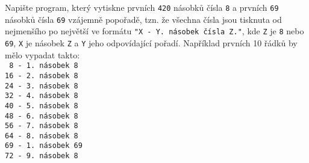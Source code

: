 \question[100]
Napište program, který vytiskne prvních \texttt{420} násobků čísla \texttt{8} a
prvních \texttt{69} násobků čísla \texttt{69} vzájemně popořadě, tzn. že
všechna
čísla jsou tisknuta od nejmenšího po největší ve formátu \texttt{"X -
	Y. násobek
	čísla Z."}, kde \texttt{Z} je \texttt{8} nebo \texttt{69},
\texttt{X} je násobek \texttt{Z} a \texttt{Y} jeho
odpovídající pořadí.
Například prvních 10 řádků by mělo vypadat takto:\\
\texttt{
	8 - 1. násobek 8\\
	16 - 2. násobek 8\\
	24 - 3. násobek 8\\
	32 - 4. násobek 8\\
	40 - 5. násobek 8\\
	48 - 6. násobek 8\\
	56 - 7. násobek 8\\
	64 - 8. násobek 8\\
	69 - 1. násobek 69\\
	72 - 9. násobek 8
}